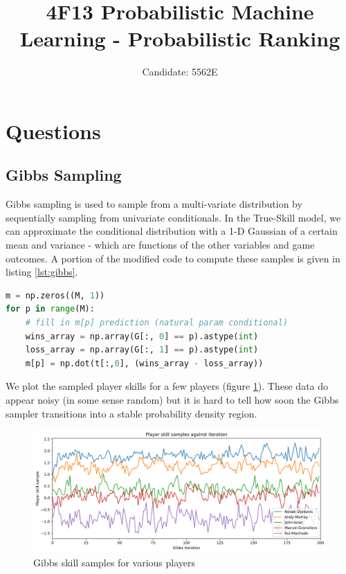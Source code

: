 \documentclass[]{article}
\title{4F13 Probabilistic Machine Learning - Probabilistic Ranking}
\author{Candidate: 5562E}
\begin{document}


\setcounter{page}{1}
\maketitle

\tableofcontents

\section{Questions}
\subsection{Gibbs Sampling}

Gibbs sampling is used to sample from a multi-variate distribution by sequentially sampling from univariate conditionals. In the True-Skill model, we can approximate the conditional distribution with a 1-D Gaussian of a certain mean and variance - which are functions of the other variables and game outcomes. A portion of the modified code to compute these samples is given in listing \ref{lst:gibbs}.

\begin{lstlisting}[frame=single, caption={Gibbs sampling additions}, label={lst:gibbs}, language={python}]
m = np.zeros((M, 1))
for p in range(M):
	# fill in m[p] prediction (natural param conditional)
	wins_array = np.array(G[:, 0] == p).astype(int)
	loss_array = np.array(G[:, 1] == p).astype(int)
	m[p] = np.dot(t[:,0], (wins_array - loss_array))
\end{lstlisting}

We plot the sampled player skills for a few players (figure \ref{fig:skill-samples-long}). These data do appear noisy (in some sense random) but it is hard to tell how soon the Gibbs sampler transitions into a stable probability density region.

\begin{figure}[!h]
	\centering
	\includegraphics[width=0.8\linewidth]{skill-samples-long.png}
	\caption{Gibbs skill samples for various players}
	\label{fig:skill-samples-long}
\end{figure}
\end{document}
